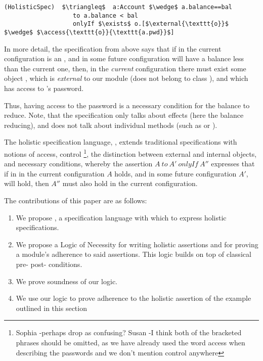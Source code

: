  \begin{lstlisting}[language = Chainmail, mathescape=true, frame=lines]
(HolisticSpec)  $\triangleq$  a:Account $\wedge$ a.balance==bal
                   to a.balance < bal
                   onlyIf $\exists$ o.[$\external{\texttt{o}}$ $\wedge$ $\access{\texttt{o}}{\texttt{a.pwd}}$]
\end{lstlisting}
 
 
 In more detail, the specification from above says that if in the current
 configuration  is an ,
 and in some future configuration  will have a balance less than the current one, then, in the \emph{current} configuration
 there must exist some object , which is \emph{external} to our module (does not belong to class
 ), and which has access to 's password.
 
 
 Thus, having access to the password is a necessary condition for the balance to reduce.
 Note, that the specification only talks about effects (here the balance reducing), and does not
 talk about individual methods (such as  or ).
 

 The holistic specification language, \Chainmail, extends traditional specifications with
notions of access, %
control 
\footnote{Sophia -perhaps drop as confusing? Susan -I think both of the bracketed phrases should be omitted, as we have already used the word access when describing the passwords and we don't mention control anywhere}, 
 the distinction between external and internal objects, and necessary conditions, 
 whereby the assertion $A~to~A'~onlyIf~A''$ expresses that if in in the current configuration
 $A$ holds, and in some future configuration $A'$, 
 will hold, then $A''$ must also hold in the 
 current configuration.  
  
 The contributions of this paper are as follows:
 
 \begin{enumerate}
 \item
 We propose \Chainmail, a specification language with which to
express holistic specifications. 
 \item
 We propose a Logic of Necessity for writing holistic assertions and for proving a module's adherence to said assertions.
 This logic builds on top of classical pre- post- conditions.
 \item
 We prove soundness of our logic.  
 \item
 We use our logic to prove adherence to the holistic assertion of the example
outlined  in this section
 \end{enumerate}
 

